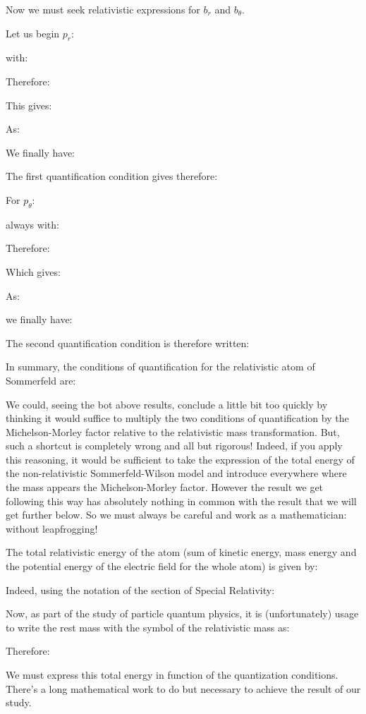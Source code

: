 	Now we must seek relativistic expressions for $b_r$ and $b_\theta$.
	
	Let us begin $p_r$:
	
	with:
	
	Therefore:
	
	This gives:
	
	As:
	
	We finally have:
	
	The first quantification condition gives therefore:
	
	For $p_\theta$:
	
	always with:
	
	Therefore:
	
	Which gives:
	
	As:
	
	we finally have:
	
	The second quantification condition\label{second quantification condition} is therefore written:
	
	In summary, the conditions of quantification for the relativistic atom of Sommerfeld are:
	
	We could, seeing the bot above results, conclude a little bit too quickly by thinking it would suffice to multiply the two conditions of quantification by the Michelson-Morley factor relative to the relativistic mass transformation. But, such a shortcut is completely wrong and all but rigorous! Indeed, if you apply this reasoning, it would be sufficient to take the expression of the total energy of the non-relativistic Sommerfeld-Wilson model and introduce everywhere where the mass appears the Michelson-Morley factor. However the result we get following this way has absolutely nothing in common with the result that we will get further below. So we must always be careful and work as a mathematician: without leapfrogging!
	
	The total relativistic energy of the atom (sum of kinetic energy, mass energy  and the potential energy of the electric field for the whole atom) is given by: 
	
	Indeed, using the notation of the section of Special Relativity:
	
	Now, as part of the study of particle quantum physics, it is (unfortunately) usage to write the rest mass with the symbol of the relativistic mass as:
	
	Therefore:
	
	We must express this total energy in function of the quantization conditions. There's a long mathematical work to do but necessary to achieve the result of our study.

